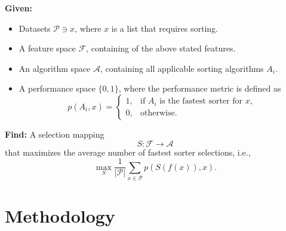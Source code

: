 \documentclass[twocolumn]{article}
\newcommand{\vsp}{\vspace{0.5em}}
\begin{document}
\vsp

\noindent \textbf{Given:}
\begin{itemize}[itemsep=0.05em, topsep=0pt]
    \item Datasets $\mathcal{P} \ni x$, where $x$ is a list that requires sorting.
    \item A feature space $\mathcal{F}$, containing of the above stated features.
    \item An algorithm space $\mathcal{A}$, containing all applicable sorting algorithms $A_i$.
    \item A performance space $\{0,1\}$, where the performance metric is defined as
    \[
    p(A_i, x) = 
    \begin{cases}
    1, & \text{if } A_i \text{ is the fastest sorter for } x, \\
    0, & \text{otherwise.}
    \end{cases}
    \]
\end{itemize}

\noindent \textbf{Find:} A selection mapping
\[
S: \mathcal{F} \rightarrow \mathcal{A}
\]
that maximizes the average number of fastest sorter selections, i.e.,
\[
\max_{S} \frac{1}{|\mathcal{P}|} \sum_{x \in \mathcal{P}} p(S(f(x)), x).
\]

\section{Methodology}



\end{document}
